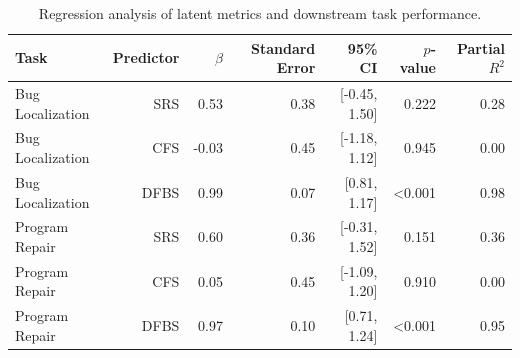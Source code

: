 \begin{table}[t]
\centering
\caption{Regression analysis of latent metrics and downstream task performance.}
\label{tab:reg}
\begin{tabular}{lrrrrrr}
\toprule
Task & Predictor & $\beta$ & Standard Error & 95\% CI & $p$-value & Partial $R^{2}$ \\
\midrule
Bug Localization & SRS & 0.53 & 0.38 & [-0.45, 1.50] & 0.222 & 0.28 \\
Bug Localization & CFS & -0.03 & 0.45 & [-1.18, 1.12] & 0.945 & 0.00 \\
Bug Localization & DFBS & 0.99 & 0.07 & [0.81, 1.17] & \textless{}0.001 & 0.98 \\
Program Repair & SRS & 0.60 & 0.36 & [-0.31, 1.52] & 0.151 & 0.36 \\
Program Repair & CFS & 0.05 & 0.45 & [-1.09, 1.20] & 0.910 & 0.00 \\
Program Repair & DFBS & 0.97 & 0.10 & [0.71, 1.24] & \textless{}0.001 & 0.95 \\
\bottomrule
\end{tabular}
\end{table}
